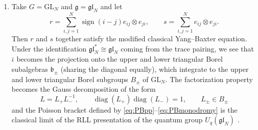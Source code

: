 \begin{example}
\begin{enumerate}[label=(\roman*)]
		The Lie bialgebra $\mathfrak{g}$ is \emph{factorizable} if $s^\sharp = \bar \sigma \circ \bar \iota$ is an isomorphism, making $\sigma \circ \iota$ a local isomorphism (giving the factorization $g = g_+ g_-^{-1}$). In the connected, simply connected case, this exhibits $G$ as a model for the dual Poisson--Lie group $G^*$ with the modified multiplication law
		\begin{equation}
			g \star h \coloneq g_+ h g_-^{-1}.
		\end{equation}
		In this model of $G^*$, the Poisson bracket $\{ -,- \}_{G^*}$ is given by
		\begin{align}
			\{ g_\pm,h_\pm \}_{G^*} &= [r,g_\pm \otimes h_\pm] \label{eq:PBpp}\\
			\{ g_\pm,h_\mp \}_{G^*} &= [r_\pm,g_\pm \otimes h_\mp] \label{eq:PBpm} \\
			\{ g,h \}_{G^*} &= r (g \otimes h) + (g \otimes h) r + (g \otimes 1) r_- (1 \otimes h) + (1 \otimes h) r_+ (g \otimes 1) \label{eq:PBmonodromy},
		\end{align}
		where $r$ standing to the left or the right indicates that it acts by the infinitesimal action coming from left or right translation on the group.
		\item \label{ex:GL}Take $G = \mathrm{GL}_N$ and $\mathfrak{g} = \mathfrak{gl}_N$ and let
		\begin{equation}
			r = \sum_{i,j=1}^N \operatorname{sign}(i-j) e_{ij} \otimes e_{ji}, \qquad s = \sum_{i,j=1}^N e_{ij} \otimes e_{ji}.
		\end{equation}
		Then $r$ and $s$ together satisfy the modified classical Yang--Baxter equation. Under the identification $\mathfrak{gl}_N^* \cong \mathfrak{gl}_N$ coming from the trace pairing, we see that $\bar \iota$ becomes the projection onto the upper and lower triangular Borel subalgebras $\mathfrak{b}_\pm$ (sharing the diagonal equally), which integrate to the upper and lower triangular Borel subgroups $B_\pm$ of $\mathrm{GL}_N$. The factorization property becomes the Gauss decomposition of the form
		\begin{equation}
			L = L_+ L_-^{-1}, \qquad \operatorname{diag}(L_+) \operatorname{diag}(L_-) = 1, \qquad L_\pm \in B_\pm
		\end{equation}
		and the Poisson bracket defined by \eqref{eq:PBpp}--\eqref{eq:PBmonodromy} is the classical limit of the RLL presentation of the quantum group $U_q(\mathfrak{gl}_N)$ \cite{faddeev_quantization_1989,reshetikhin_quantum_1988}.
	\end{enumerate}
\end{example}

